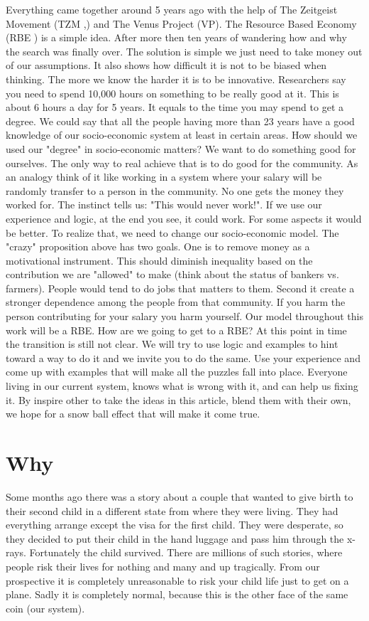 \documentclass{article}
\begin{document}
Everything came together around 5 years ago with the help of The Zeitgeist Movement (TZM \cite{tzm},\cite{tzfs}) and The Venus Project (VP).
The Resource Based Economy (RBE \cite{rbe}) is a simple idea.
After more then ten years of wandering how and why the search was finally over.
The solution is simple we just need to take money out of our assumptions.
It also shows how difficult it is not to be biased when thinking.
The more we know the harder it is to be innovative.
Researchers \cite{gaming} say you need to spend 10,000 hours on something to be really good at it.
This is about 6 hours a day for 5 years.
It equals to the time you may spend to get a degree.
We could say that all the people having more than 23 years have a good knowledge of our socio-economic system at least in certain areas.
How should we used our "degree" in socio-economic matters?
We want to do something good for ourselves.
The only way to real achieve that is to do good for the community.
As an analogy think of it like working in a system where your salary will be randomly transfer to a person in the community.
No one gets the money they worked for.
The instinct tells us: "This would never work!".
If we use our experience and logic, at the end you see, it could work.
For some aspects it would be better.
To realize that, we need to change our socio-economic model.
The "crazy" proposition above has two goals.
One is to remove money as a motivational instrument\cite{motivation}.
This should diminish inequality based on the contribution we are "allowed" to make (think about the status of bankers vs. farmers).
People would tend to do jobs that matters to them.
Second it create a stronger dependence among the people from that community.
If you harm the person contributing for your salary you harm yourself.
Our model throughout this work will be a RBE.
How are we going to get to a RBE?
At this point in time the transition is still not clear.
We will try to use logic and examples to hint toward a way to do it and we invite you to do the same.
Use your experience and come up with examples that will make all the puzzles fall into place.
Everyone living in our current system, knows what is wrong with it, and can help us fixing it.
By inspire other to take the ideas in this article, blend them with their own, we hope for a snow ball effect that will make it come true.

\section{Why}
\label{sec:why}
Some months ago there was a story about a couple that wanted to give birth to their second child in a different state from where they were living.
They had everything arrange except the visa for the first child.
They were desperate, so they decided to put their child in the hand luggage and pass him through the x-rays.
Fortunately the child survived.
There are millions of such stories, where people risk their lives for nothing and many and up tragically.
From our prospective it is completely unreasonable to risk your child life just to get on a plane.
Sadly it is completely normal, because this is the other face of the same coin (our system).
\end{document}
